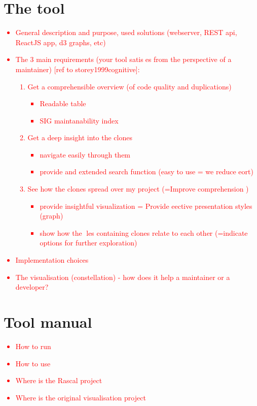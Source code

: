 \documentclass{uva-inf-article}
\newcommand\todo[1]{\textcolor{red}{#1}}
\begin{document}
\section{The tool}
\todo{
\begin{itemize}
\item{General description and purpose, used solutions (webserver, REST api, ReactJS app, d3 graphs, etc)}
\item{The 3 main requirements (your tool satises from the perspective of a maintainer) [ref to storey1999cognitive]:
  \begin{enumerate}
    \item{Get a comprehensible overview (of code quality and duplications) 
      \begin{itemize}
        \item{Readable table}
        \item{SIG maintanability index}
      \end{itemize}
      }
    \item{Get a deep insight into the clones 
      \begin{itemize}
        \item{navigate easily through them}
        \item{provide and extended search function (easy to use = we reduce eort)}
      \end{itemize}
     }
    \item{See how the clones spread over my project (=Improve comprehension ) 
      \begin{itemize}
        \item{provide insightful visualization = Provide eective presentation styles (graph)}
        \item{show how the les containing clones relate to each other (=indicate options for further exploration)}
      \end{itemize}
      }
  \end{enumerate}
}
\item{Implementation choices}
\item{The visualisation (constellation) - how does it help a maintainer or a developer?}
\end{itemize}
}


\section{Tool manual}
\todo {
	\begin{itemize}
		\item{How to run}
		\item{How to use}
		\item{Where is the Rascal project}
		\item{Where is the original visualisation project }
	\end{itemize}
}
\end{document}

